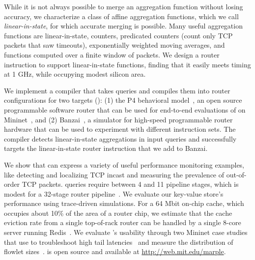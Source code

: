 While it is not always possible to merge an aggregation function without losing
accuracy, we characterize a class of affine aggregation functions, which we
call {\em linear-in-state}, for which accurate merging is possible.  Many
useful aggregation functions are linear-in-state, \eg counters, predicated
counters (\eg count only TCP packets that saw timeouts), exponentially weighted
moving averages, and functions computed over a finite window of packets.  We
design a router instruction to support linear-in-state functions, finding that
it easily meets timing at 1 GHz, while occupying modest silicon area.

 We implement a compiler that takes \TheSystem queries
and compiles them into router configurations for two targets ():
(1) the P4 behavioral model~\cite{p4-bmv2}, an open source programmable
software router that can be used for end-to-end evaluations of \TheSystem on
Mininet~\cite{mininet}, and (2) Banzai~\cite{domino_sigcomm}, a simulator for high-speed
programmable router hardware that can be used to experiment with different instruction sets.
The \TheSystem compiler detects linear-in-state aggregations in input queries
and successfully targets the linear-in-state router instruction that we add to
Banzai.

 We show that \TheSystem can express a variety of useful
performance monitoring examples, like detecting and localizing TCP incast and
measuring the prevalence of out-of-order TCP packets. \TheSystem queries
require between 4 and 11 pipeline stages, which is modest for a 32-stage router
pipeline~\cite{rmt}. We evaluate our key-value store's performance using
trace-driven simulations. For a 64 Mbit on-chip cache, which occupies about
10\% of the area of a \tengrouter router chip, we estimate that the cache eviction rate
from a single top-of-rack router can be handled by a single 8-core server running
Redis~\cite{redis}.
We evaluate \TheSystem's usability through two Mininet case studies
that use \TheSystem to troubleshoot high tail latencies~\cite{barefoot-demo} and
measure the distribution of flowlet sizes~\cite{conga}. \TheSystem is open
source and available at \url{http://web.mit.edu/marple}.
